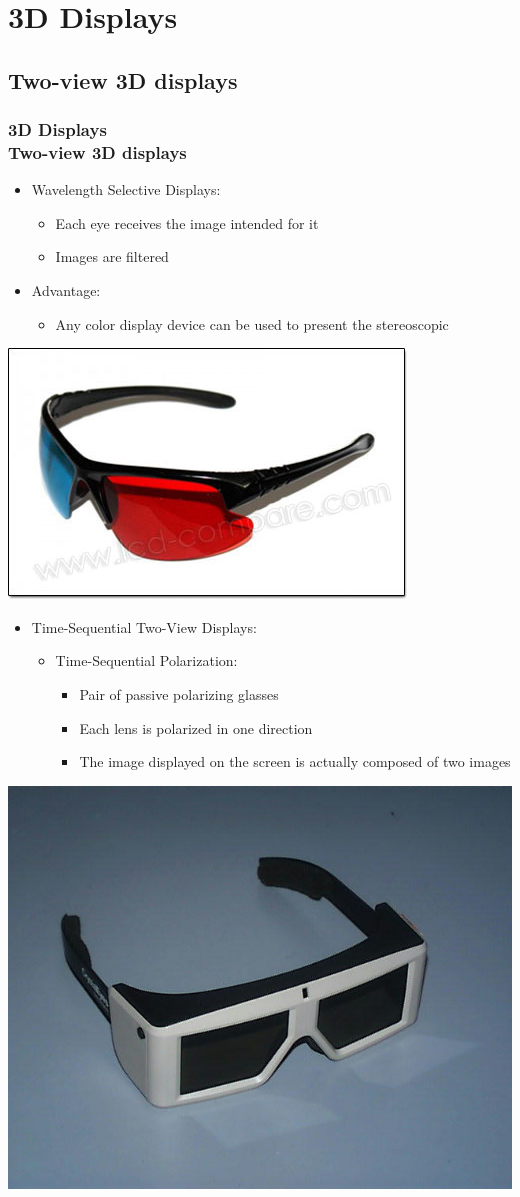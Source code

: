 
\section{3D Displays}
\subsection{Two-view 3D displays}
\begin{frame}

  \frametitle{3D Displays \\Two-view 3D displays} 
  
  \begin{itemize}
  \item Wavelength Selective Displays:
    
    \begin{itemize}
    \item Each eye receives the image intended for it
    \item Images are filtered	
    \end{itemize}
    
    
    
  \item Advantage:
    \begin{itemize} 	
    \item Any color display device can be used to present the stereoscopic
    \end{itemize}
    \end{itemize}
  \includegraphics[keepaspectratio,height=.13\linewidth]{1.jpg}
\end{frame}


\begin{frame}		  	
  \begin{itemize}
  \item Time-Sequential Two-View Displays:
    \begin{itemize}
    \item Time-Sequential Polarization:
      \begin{itemize}
      \item Pair of passive polarizing glasses
      \item Each lens is polarized in one direction
      \item The image displayed on the screen is actually composed of two images
      \end{itemize}
    \end{itemize}
  \end{itemize}
  \includegraphics[keepaspectratio,height=.2\linewidth]{2.jpg}
\end{frame}

